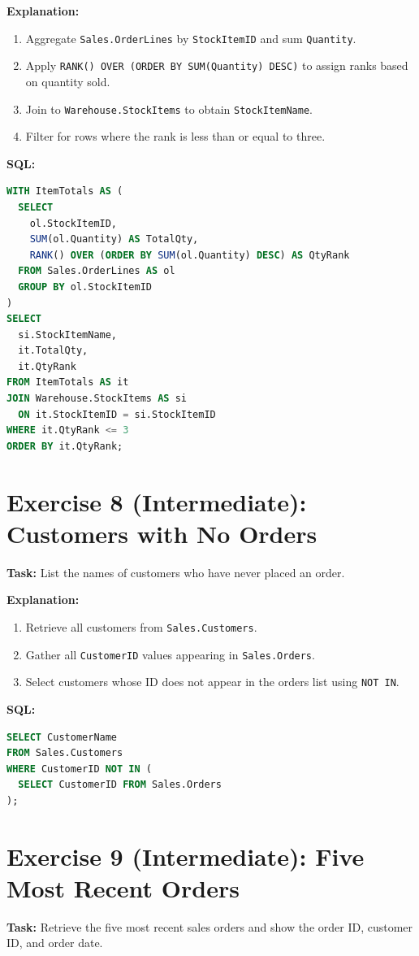 \documentclass[12pt,a4paper]{article}
\begin{document}
\textbf{Explanation:}
\begin{enumerate}
  \item Aggregate \texttt{Sales.OrderLines} by \texttt{StockItemID} and sum \texttt{Quantity}.
  \item Apply \texttt{RANK() OVER (ORDER BY SUM(Quantity) DESC)} to assign ranks based on quantity sold.
  \item Join to \texttt{Warehouse.StockItems} to obtain \texttt{StockItemName}.
  \item Filter for rows where the rank is less than or equal to three.
\end{enumerate}

\textbf{SQL:}
\begin{lstlisting}[language=SQL]
WITH ItemTotals AS (
  SELECT 
    ol.StockItemID,
    SUM(ol.Quantity) AS TotalQty,
    RANK() OVER (ORDER BY SUM(ol.Quantity) DESC) AS QtyRank
  FROM Sales.OrderLines AS ol
  GROUP BY ol.StockItemID
)
SELECT 
  si.StockItemName,
  it.TotalQty,
  it.QtyRank
FROM ItemTotals AS it
JOIN Warehouse.StockItems AS si
  ON it.StockItemID = si.StockItemID
WHERE it.QtyRank <= 3
ORDER BY it.QtyRank;
\end{lstlisting}

\section{Exercise 8 (Intermediate): Customers with No Orders}
\textbf{Task:} List the names of customers who have never placed an order.

\textbf{Explanation:}
\begin{enumerate}
  \item Retrieve all customers from \texttt{Sales.Customers}.
  \item Gather all \texttt{CustomerID} values appearing in \texttt{Sales.Orders}.
  \item Select customers whose ID does not appear in the orders list using \texttt{NOT IN}.
\end{enumerate}

\textbf{SQL:}
\begin{lstlisting}[language=SQL]
SELECT CustomerName
FROM Sales.Customers
WHERE CustomerID NOT IN (
  SELECT CustomerID FROM Sales.Orders
);
\end{lstlisting}

\section{Exercise 9 (Intermediate): Five Most Recent Orders}
\textbf{Task:} Retrieve the five most recent sales orders and show the order ID, customer ID, and order date.
\end{document}
